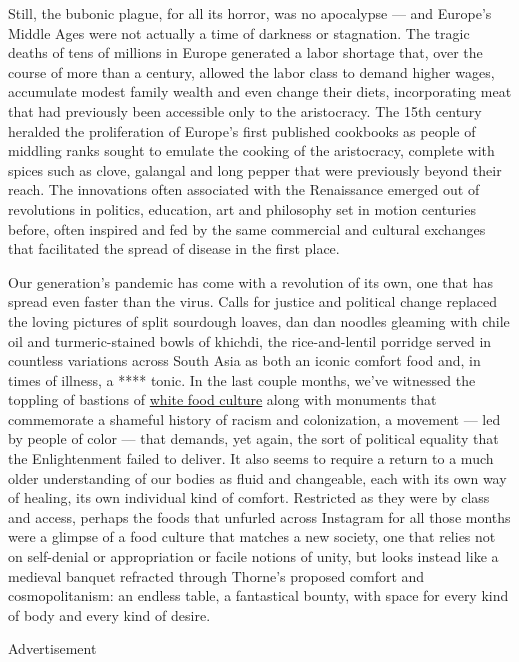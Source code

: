 Still, the bubonic plague, for all its horror, was no apocalypse --- and
Europe's Middle Ages were not actually a time of darkness or stagnation.
The tragic deaths of tens of millions in Europe generated a labor
shortage that, over the course of more than a century, allowed the labor
class to demand higher wages, accumulate modest family wealth and even
change their diets, incorporating meat that had previously been
accessible only to the aristocracy. The 15th century heralded the
proliferation of Europe's first published cookbooks as people of
middling ranks sought to emulate the cooking of the aristocracy,
complete with spices such as clove, galangal and long pepper that were
previously beyond their reach. The innovations often associated with the
Renaissance emerged out of revolutions in politics, education, art and
philosophy set in motion centuries before, often inspired and fed by the
same commercial and cultural exchanges that facilitated the spread of
disease in the first place.

Our generation's pandemic has come with a revolution of its own, one
that has spread even faster than the virus. Calls for justice and
political change replaced the loving pictures of split sourdough loaves,
dan dan noodles gleaming with chile oil and turmeric-stained bowls of
khichdi, the rice-and-lentil porridge served in countless variations
across South Asia as both an iconic comfort food and, in times of
illness, a **** tonic. In the last couple months, we've witnessed the
toppling of bastions of
\href{https://www.nytimes.com/2020/06/29/dining/john-t-edge-southern-foodways-alliance.html}{white
food culture} along with monuments that commemorate a shameful history
of racism and colonization, a movement --- led by people of color ---
that demands, yet again, the sort of political equality that the
Enlightenment failed to deliver. It also seems to require a return to a
much older understanding of our bodies as fluid and changeable, each
with its own way of healing, its own individual kind of comfort.
Restricted as they were by class and access, perhaps the foods that
unfurled across Instagram for all those months were a glimpse of a food
culture that matches a new society, one that relies not on self-denial
or appropriation or facile notions of unity, but looks instead like a
medieval banquet refracted through Thorne's proposed comfort and
cosmopolitanism: an endless table, a fantastical bounty, with space for
every kind of body and every kind of desire.

Advertisement

